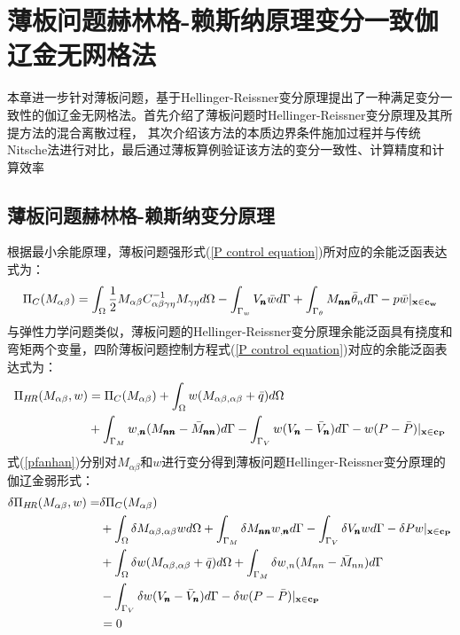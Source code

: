 \chapter{薄板问题赫林格-赖斯纳原理变分一致伽辽金无网格法}
本章进一步针对薄板问题，基于Hellinger-Reissner变分原理提出了一种满足变分一致性的伽辽金无网格法。首先介绍了薄板问题时Hellinger-Reissner变分原理及其所提方法的混合离散过程，
其次介绍该方法的本质边界条件施加过程并与传统Nitsche法进行对比，最后通过薄板算例验证该方法的变分一致性、计算精度和计算效率
\section{薄板问题赫林格-赖斯纳变分原理}
根据最小余能原理，薄板问题强形式(\ref{P control equation})所对应的余能泛函表达式为：
\begin{equation}
\Pi_C(M_{\alpha\beta})=\int_{\Omega}\frac{1}{2}M_{\alpha\beta}C^{-1}_{\alpha\beta\gamma\eta}M_{\gamma\eta}d\Omega-\int_{\Gamma_w}V_{\pmb n}\bar{w}d\Gamma+\int_{\Gamma_{\theta}}M_{\pmb{nn}}\bar{\theta}_nd\Gamma-p\bar{w}\vert_{\bf{x}\in{c_w}}
\end{equation}
与弹性力学问题类似，薄板问题的Hellinger-Reissner变分原理余能泛函具有挠度和弯矩两个变量，四阶薄板问题控制方程式(\ref{P control equation})对应的余能泛函表达式为：
\begin{equation}\label{pfanhan}
\begin{split}
    \Pi_{H\!R}(M_{\alpha\beta},w)&=\Pi_C(M_{\alpha\beta})+\int_{\Omega}w(M_{\alpha\beta,\alpha\beta}+\bar{q})d\Omega\\
    &+\int_{\Gamma_M}w_{,\pmb n}(M_{\pmb{nn}}-\bar{M}_{\pmb{nn}})d\Gamma
    -\int_{\Gamma_V}w(V_{\pmb n}-\bar{V}_{\pmb n})d\Gamma-w(P-\bar{P})\vert_{\bf{x}\in{c_P}}
\end{split}
\end{equation}
式(\ref{pfanhan})分别对$M_{\alpha\beta}$和$w$进行变分得到薄板问题Hellinger-Reissner变分原理的伽辽金弱形式：
\begin{equation}\label{Pweakfrom}
\begin{split}
    \delta\Pi_{H\!R}(M_{\alpha\beta},w)=&\delta\Pi_C(M_{\alpha\beta})\\
    &+\int_{\Omega}\delta M_{\alpha\beta,\alpha\beta}wd\Omega+\int_{\Gamma_M}\delta M_{\pmb{nn}}w_{,\pmb n}d\Gamma-\int_{\Gamma_V}\delta V_{\pmb n}wd\Gamma-\delta Pw\vert_{\bf{x}\in{c_P}}\\
    &+\int_{\Omega}\delta w(M_{\alpha\beta,\alpha\beta}+\bar{q})d\Omega+\int_{\Gamma_M}\delta w_{,n}(M_{nn}-\bar{M}_{nn})d\Gamma\\
    &-\int_{\Gamma_V}\delta w(V_{\pmb n}-\bar{V}_{\pmb n})d\Gamma-\delta w(P-\bar{P})\vert_{\bf{x}\in{c_P}}\\
    &=0
\end{split}
\end{equation}\par
